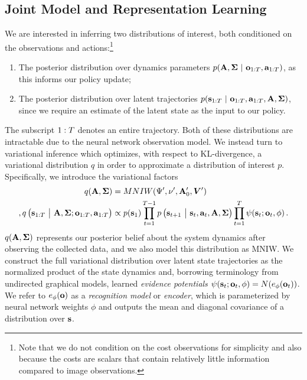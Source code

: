 \subsection{Joint Model and Representation Learning}
\label{sec:var-family}

We are interested in inferring two distributions of interest, both conditioned on the observations and actions:\footnote{Note that we do not condition on the cost observations for simplicity and also because the costs are scalars that contain relatively little information compared to image observations.}
\vspace{-.5em}
\begin{enumerate}
    \itemsep0em
    \item The posterior distribution over dynamics parameters $p(\mathbf{A},\bm{\Sigma}~|~\mathbf{o}_{1:T},\mathbf{a}_{1:T})$, as this informs our policy update;
    \item The posterior distribution over latent trajectories $p(\mathbf{s}_{1:T}~|~\mathbf{o}_{1:T},\mathbf{a}_{1:T},\mathbf{A},\bm{\Sigma})$, since we require an estimate of the latent state as the input to our policy.
\end{enumerate}
\vspace{-.5em}
The subscript $1:T$ denotes an entire trajectory. Both of these distributions are intractable due to the neural network observation model. We instead turn to variational inference which optimizes, with respect to KL-divergence, a variational distribution $q$ in order to approximate a distribution of interest $p$. Specifically, we introduce the variational factors
\begin{align*}
    q(\mathbf{A},\bm{\Sigma})&=MNIW(\Psi',\nu',\mathbf{A}_0',\bm{V}')\,\\,
    q\left(\mathbf{s}_{1:T}~\big|~\mathbf{A},\bm{\Sigma};\mathbf{o}_{1:T},\mathbf{a}_{1:T}\right)&\propto
    p(\mathbf{s}_1)\prod_{t=1}^{T-1}p\left(\mathbf{s}_{t+1}~\big|~\mathbf{s}_t,\mathbf{a}_t,\mathbf{A},\bm{\Sigma}\right)\prod_{t=1}^{T}\psi(\mathbf{s}_t;\mathbf{o}_t,\phi)\,.
\end{align*}
$q(\mathbf{A},\bm{\Sigma})$ represents our posterior belief about the system dynamics after observing the collected data, and we also model this distribution as MNIW. We construct the full variational distribution over latent state trajectories as the normalized product of the state dynamics and, borrowing terminology from undirected graphical models, learned \emph{evidence potentials} $\psi(\mathbf{s}_t;\mathbf{o}_t,\phi)=N(e_\phi(\mathbf{o}_t))$. We refer to $e_\phi(\mathbf{o})$ as a \emph{recognition model} or \emph{encoder}, which is parameterized by neural network weights $\phi$ and outputs the mean and diagonal covariance of a distribution over $\mathbf{s}$.

